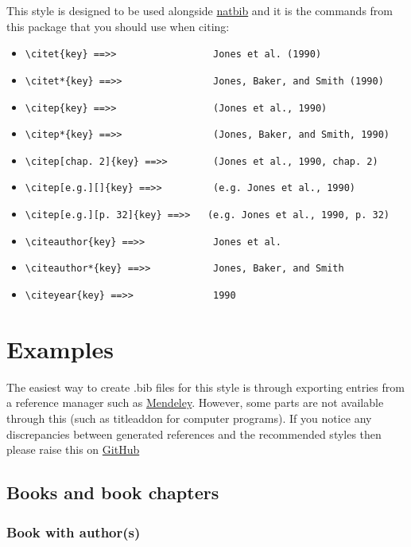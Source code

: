 \documentclass{article}
\begin{document}
This style is designed to be used alongside \href{https://ctan.org/pkg/natbib}{natbib} and it is the commands from this package that you should use when citing:
\begin{itemize}
    \item \lstinline!\citet{key} ==>>                 Jones et al. (1990)!
    \item \lstinline!\citet*{key} ==>>                Jones, Baker, and Smith (1990)!
    \item \lstinline!\citep{key} ==>>                 (Jones et al., 1990)!
    \item \lstinline!\citep*{key} ==>>                (Jones, Baker, and Smith, 1990)!
    \item \lstinline!\citep[chap. 2]{key} ==>>        (Jones et al., 1990, chap. 2)!
    \item \lstinline!\citep[e.g.][]{key} ==>>         (e.g. Jones et al., 1990)!
    \item \lstinline!\citep[e.g.][p. 32]{key} ==>>   (e.g. Jones et al., 1990, p. 32)!
    \item \lstinline!\citeauthor{key} ==>>            Jones et al.!
    \item \lstinline!\citeauthor*{key} ==>>           Jones, Baker, and Smith!
    \item \lstinline!\citeyear{key} ==>>              1990!
\end{itemize}

\section{Examples}

The easiest way to create .bib files for this style is through exporting entries from a reference manager such as \href{https://www.mendeley.com/}{Mendeley}.
However, some parts are not available through this (such as titleaddon for computer programs).
If you notice any discrepancies between generated references and the recommended styles then please raise this on \href{https://github.com/LukeBriggsDev/Newcastle-BibTeX/issues}{GitHub}

\subsection{Books and book chapters}
\subsubsection*{Book with author(s)}
\end{document}
